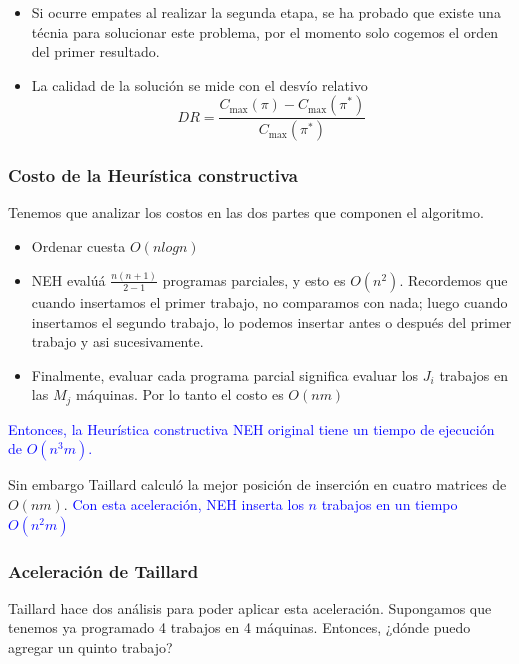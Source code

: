 \documentclass[10pt, a4paper]{article}
\begin{document}
\begin{itemize}
  \item Si ocurre empates al realizar la segunda etapa, se ha probado que existe
    una técnia para solucionar este problema, por el momento solo cogemos el 
    orden del primer resultado.

  \item La calidad de la solución se mide con el desvío relativo
    \[
      DR = \frac{C_{\max}(\pi) - C_{\max}(\pi^*)}{C_{\max}(\pi^*)}
    \]
\end{itemize}

\subsubsection{Costo de la Heurística constructiva}
Tenemos que analizar los costos en las dos partes que componen el algoritmo.

\begin{itemize}
  \item Ordenar cuesta $O(nlogn)$

  \item NEH evalúá $\frac{n(n+1)}{2-1}$ programas parciales, y esto es $O(n^2)$. 
    Recordemos que cuando insertamos el primer trabajo, no comparamos con nada;
    luego cuando insertamos el segundo trabajo, lo podemos insertar antes o 
    después del primer trabajo y asi sucesivamente.

  \item Finalmente, evaluar cada programa parcial significa evaluar los $J_i$ 
    trabajos en las $M_j$ máquinas. Por lo tanto el costo es $O(nm)$
\end{itemize}

\textcolor{blue}{Entonces, la Heurística constructiva NEH original tiene un tiempo 
de ejecución de $O(n^3m)$.}

\singlespacing

Sin embargo Taillard calculó la mejor posición de inserción en cuatro matrices 
de $O(nm)$. \textcolor{blue}{Con esta aceleración, NEH inserta los $n$ trabajos en 
un tiempo $O(n^2m)$}

\subsubsection{Aceleración de Taillard}

Taillard hace dos análisis para poder aplicar esta aceleración. Supongamos que 
tenemos ya programado 4 trabajos en 4 máquinas. Entonces, ¿dónde puedo agregar un 
quinto trabajo?
\end{document}
